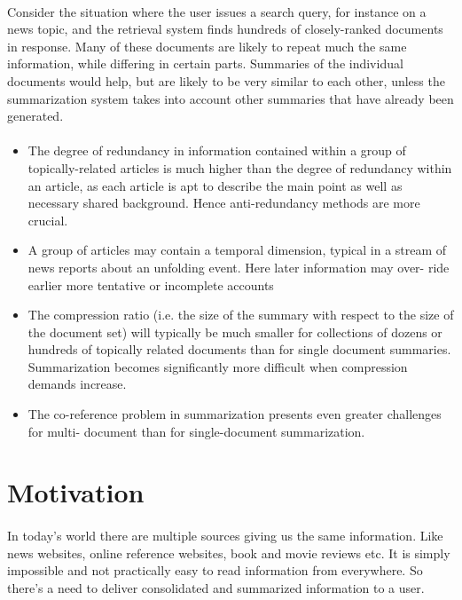 \paragraph{}Consider the situation where the user issues a search query, for instance on a news topic, and the retrieval system finds hundreds of closely-ranked documents in response. Many of these documents are likely to repeat much the same information, while differing in certain parts. Summaries of the individual documents would help, but are likely to be very similar to each other, unless the summarization system takes into account other summaries that have already been generated.


\paragraph{}
\begin{itemize}
\item The degree of redundancy in information contained within a group of topically-related articles is much higher than the degree of redundancy within an article, as each article is apt to describe the main point as well as necessary shared background. Hence anti-redundancy methods are more crucial.
\item A group of articles may contain a temporal dimension, typical in a stream of news reports about an unfolding event. Here later information may over- ride earlier more tentative or incomplete accounts
\item The compression ratio (i.e. the size of the summary with respect to the size of the document set) will typically be much smaller for collections of dozens or hundreds of topically related documents than for single document summaries. Summarization becomes significantly more difficult when compression demands increase.
\item The co-reference problem in summarization presents even greater challenges for multi- document than for single-document summarization.\cite{Publication2}
\end{itemize}
\section{Motivation}
\paragraph{} In today’s world there are multiple sources giving us the same information. Like news websites, online reference websites, book and movie reviews etc. It is simply impossible and not practically easy to read information from everywhere. So there’s a need to deliver consolidated and summarized information to a user.
